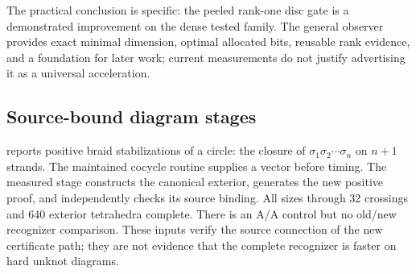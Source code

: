 The practical conclusion is specific: the peeled rank-one disc gate is a
demonstrated improvement on the dense tested family.  The general observer
provides exact minimal dimension, optimal allocated bits, reusable rank
evidence, and a foundation for later work; current measurements do not justify
advertising it as a universal acceleration.

\subsection{Source-bound diagram stages}

 reports positive braid stabilizations of a circle:
the closure of $\sigma_1\sigma_2\cdots\sigma_n$ on $n+1$ strands.  The
maintained cocycle routine supplies a vector before timing.  The measured
stage constructs the canonical exterior, generates the new positive proof,
and independently checks its source binding.  All sizes through 32 crossings
and 640 exterior tetrahedra complete.  There is an A/A control but no old/new
recognizer comparison.  These inputs verify the source connection of the
new certificate path; they are not evidence that the complete recognizer is
faster on hard unknot diagrams.

